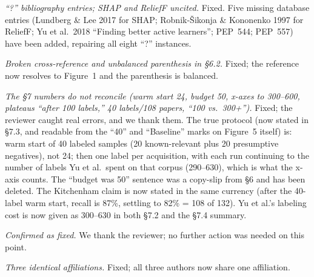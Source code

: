 \documentclass[11pt]{article}
\begin{document}
\smallskip{} {\em ``?'' bibliography entries; SHAP and
ReliefF uncited.} Fixed. Five missing database entries
(Lundberg \& Lee 2017 for SHAP; Robnik-\v{S}ikonja \&
Kononenko 1997 for ReliefF; Yu et al.\ 2018 ``Finding better
active learners''; PEP~544; PEP~557) have been added, repairing
all eight ``?'' instances.

\smallskip{} {\em Broken cross-reference and unbalanced
parenthesis in \S6.2.} Fixed; the reference now resolves to
Figure~1 and the parenthesis is balanced.

\smallskip{} {\em The \S7 numbers do not reconcile (warm
start 24, budget 50, x-axes to 300--600, plateaus ``after 100
labels,'' 40 labels/108 papers, ``100 vs.\ 300+'').} Fixed; the
reviewer caught real errors, and we thank them. The true protocol
(now stated in \S7.3, and readable from the ``40'' and
``Baseline'' marks on Figure~5 itself) is: warm start
of 40 labeled samples (20 known-relevant plus 20 presumptive
negatives), not 24; then one label per acquisition, with each run
continuing to the number of labels Yu et al.\ spent on that
corpus (290--630), which is what the x-axis counts. The ``budget
was 50'' sentence was a copy-slip from \S6 and has been deleted.
The Kitchenham claim is now stated in the same currency (after
the 40-label warm start, recall is 87\%, settling to 82\% = 108
of 132). Yu et al.'s labeling cost is now given as 300--630 in
both \S7.2 and the \S7.4 summary.

\smallskip{} {\em Confirmed as fixed.} We
thank the reviewer; no further action was needed on this point.

\smallskip{} {\em Three identical affiliations.} Fixed;
all three authors now share one affiliation.
\end{document}
